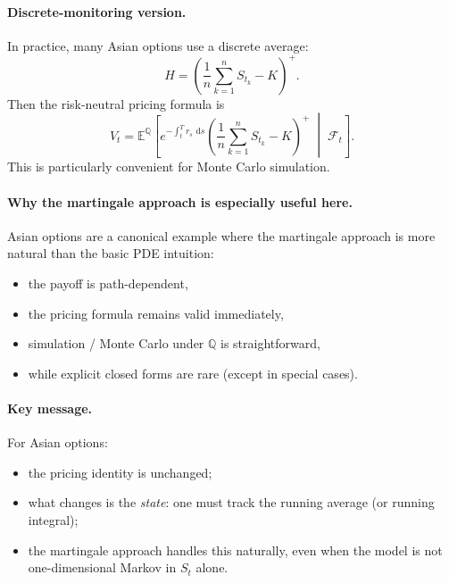 \documentclass[11pt]{article}
\newcommand{\Qbb}{\mathbb{Q}}
\newcommand{\E}{\mathbb{E}}
\newcommand{\dd}{\,\mathrm{d}}
\newcommand{\1}{\mathbf{1}}
\begin{document}
\paragraph{Discrete-monitoring version.}
In practice, many Asian options use a discrete average:
\[
H=\left(\frac{1}{n}\sum_{k=1}^n S_{t_k}-K\right)^+.
\]
Then the risk-neutral pricing formula is
\[
V_t
=
\E^{\Qbb}\!\left[
e^{-\int_t^T r_s\,\dd s}
\left(\frac{1}{n}\sum_{k=1}^n S_{t_k}-K\right)^+
\;\middle|\;
\mathcal F_t
\right].
\]
This is particularly convenient for Monte Carlo simulation.

\paragraph{Why the martingale approach is especially useful here.}
Asian options are a canonical example where the martingale approach is more natural than the basic PDE intuition:
\begin{itemize}[leftmargin=1.4em]
    \item the payoff is path-dependent,
    \item the pricing formula remains valid immediately,
    \item simulation / Monte Carlo under \(\Qbb\) is straightforward,
    \item while explicit closed forms are rare (except in special cases).
\end{itemize}

\paragraph{Key message.}
For Asian options:
\begin{itemize}[leftmargin=1.4em]
    \item the pricing identity is unchanged;
    \item what changes is the \emph{state}: one must track the running average (or running integral);
    \item the martingale approach handles this naturally, even when the model is not one-dimensional Markov in \(S_t\) alone.
\end{itemize}
\end{document}
